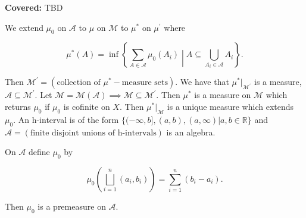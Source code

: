 \documentclass{functionspaces}
\begin{document}
\textbf{Covered:} TBD

\begingroup
\setlength{\parskip}{6pt}
\setlength{\parindent}{0pt}

We extend $\mu_{0}$ on $\mathcal{A}$ to $\mu$ on $\mathcal{M}$ to $\mu^{*}$ on $\mu^{\prime}$ where

\[
\mu^{*}(A) = \inf\left\{\sum_{A \in \mathcal{A}} \mu_{0}(A_{i}) \middle| A \subseteq \bigcup_{A_{i} \in \mathcal{A}} A_{i}\right\}.
\]

Then $\mathcal{M}^{\prime} = (\text{collection of } \mu^{*}-\text{measure sets}).$ We have that $\mu^{*}|_{\mathcal{M}^{\prime}}$ is a measure, $\mathcal{A} \subseteq \mathcal{M}^{\prime}.$ Let $\mathcal{M} = \mathcal{M}(\mathcal{A}) \implies \mathcal{M} \subseteq \mathcal{M}^{\prime}.$ Then $\mu^{*}$ is a measure on $\mathcal{M}$ which returns $\mu_{0}$ if $\mu_{0}$ is cofinite on $X.$ Then $\mu^{*}|_{\mathcal{M}}$ is a unique measure which extends $\mu_{0}.$ An h-interval is of the form $\{(-\infty,b],(a,b),(a,\infty)|a,b \in \mathbb{R}\}$ and $\mathcal{A} = (\text{finite disjoint unions of h-intervals})$ is an algebra.

\begin{proposition}
On $\mathcal{A}$ define $\mu_{0}$ by

\[
\mu_{0}\left(\bigsqcup_{i=1}^{n} (a_{i},b_{i})\right) = \sum_{i=1}^{n} (b_{i} - a_{i}).
\]

Then $\mu_{0}$ is a premeasure on $\mathcal{A}.$
\end{proposition}
\end{document}
